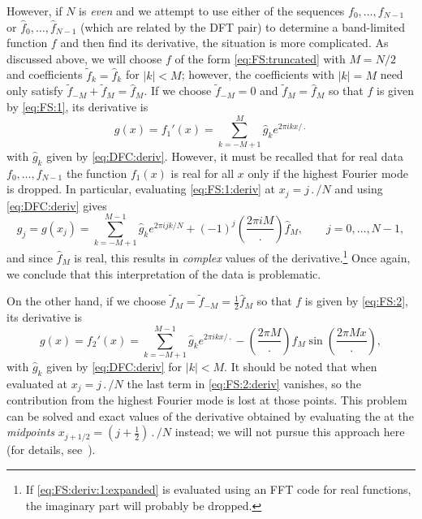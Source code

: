 \documentclass[12pt]{article}
\newcommand{\abs}[1]{\left|{#1}\right|}
\newcommand{\fc}[1]{\widetilde{#1}} %
\newcommand{\dfc}[1]{\widehat{#1}}  %
\begin{document}
However, if $N$ is \emph{even} and we attempt to use either of the sequences
$f_0,\dots,f_{N-1}$ or $\dfc{f}_0,\dots,\dfc{f}_{N-1}$ (which are related by
the DFT pair) to determine a band-limited function $f$ and then find its
derivative, the situation is more complicated.  As discussed above, we will
choose $f$ of the form \eqref{eq:FS:truncated} with $M=N/2$ and coefficients
$\fc{f}_k=\dfc{f}_k$ for $\abs{k}<M$; however, the coefficients with
$\abs{k}=M$ need only satisfy $\fc{f}_{-M}+\fc{f}_{M}=\dfc{f}_{M}$.
If we choose $\fc{f}_{-M}=0$ and $\fc{f}_M=\dfc{f}_M$ so that $f$ is given by
\eqref{eq:FS:1}, its derivative is 
\begin{equation}
   g(x) = f_1'(x) = \sum_{k=-M+1}^{M} \dfc{g}_k e^{2\pi ikx/\period} 
\label{eq:FS:1:deriv}
\end{equation}
with $\dfc{g}_k$ given by \eqref{eq:DFC:deriv}.  However, it must be recalled
that for real data $f_0,\dots,f_{N-1}$ the function $f_1(x)$ is real for all
$x$ only if the highest Fourier mode is dropped.  In particular, evaluating
\eqref{eq:FS:1:deriv} at $x_j=j\period/N$ and using \eqref{eq:DFC:deriv} gives
\begin{equation}
   g_j = g(x_j) = \sum_{k=-M+1}^{M-1} \dfc{g}_k e^{2\pi ijk/N} 
       + (-1)^j\left(\frac{2\pi iM}{\period}\right)\dfc{f}_{M},
\qquad j=0,\dots,N-1 ,
\label{eq:FS:deriv:1:expanded}
\end{equation}
and since $\dfc{f}_{M}$ is real, this results in \emph{complex} values of the
derivative.\footnote{If \eqref{eq:FS:deriv:1:expanded} is evaluated using an
FFT code for real functions, the imaginary part will probably be dropped.}
Once again, we conclude that this interpretation of the data is problematic.

On the other hand, if we choose $\fc{f}_{M} = \fc{f}_{-M} =
\frac12\dfc{f}_{M}$ so that $f$ is given by \eqref{eq:FS:2}, its derivative is
\begin{equation}
   g(x) = f_2'(x) = \sum_{k=-M+1}^{M-1} \dfc{g}_k e^{2\pi ikx/\period}
        - \left(\frac{2\pi M}{\period}\right) 
          \dfc{f}_{M}\sin\left(\frac{2\pi Mx}{\period}\right) ,
\label{eq:FS:2:deriv}
\end{equation}
with $\dfc{g}_k$ given by \eqref{eq:DFC:deriv} for $\abs{k}<M$.  It should
be noted that when evaluated at $x_j=j\period/N$ the last term in
\eqref{eq:FS:2:deriv} vanishes, so the contribution from the highest Fourier
mode is lost at those points.  This problem can be solved and exact values of
the derivative obtained by evaluating the at the \emph{midpoints} $x_{j+1/2} =
(j+\tfrac12)\period/N$ instead; we will not pursue this approach here (for
details, see~\cite{BrandtEtAl84}).
\end{document}

